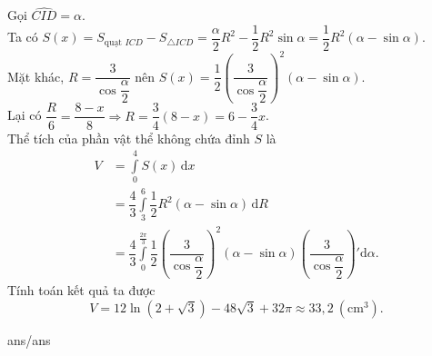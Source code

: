 \begin{ex}
{\begin{center}
		\end{center}
		Gọi $\widehat{CID}=\alpha$.
		\\
		Ta có
		$S(x)=S_{\text{quạt } ICD}-S_{\triangle ICD}
		= \dfrac{\alpha}{2} R^2-\dfrac{1}{2} R^2 \sin\alpha
		= \dfrac{1}{2} R^2 (\alpha-\sin\alpha)$.
		\\
		Mặt khác, $R=\dfrac{3}{\cos \dfrac{\alpha}{2}}$ nên $S(x)=\dfrac{1}{2} \left( \dfrac{3}{\cos \dfrac{\alpha}{2}} \right)^2 (\alpha-\sin\alpha)$.
		\\
		Lại có
		$\dfrac{R}{6}=\dfrac{8-x}{8}\Rightarrow R=\dfrac{3}{4}(8-x)=6-\dfrac{3}{4}x$.
		\\
		Thể tích của phần vật thể không chứa đỉnh $S$ là
		\allowdisplaybreaks
		\begin{align*}
			V &= \displaystyle\int\limits_{0}^{4} S(x) \mathrm{\,d}x
			\\
			&= \dfrac{4}{3} \displaystyle\int\limits_{3}^{6} \dfrac{1}{2} R^2 (\alpha-\sin\alpha)\mathrm{\,d}R
			\\
			&= \dfrac{4}{3} \displaystyle\int\limits_{0}^{\tfrac{2\pi}{3}} \dfrac{1}{2}
			\left( \dfrac{3}{\cos \dfrac{\alpha}{2}} \right)^2
			(\alpha-\sin\alpha)
			\left( \dfrac{3}{\cos \dfrac{\alpha}{2}} \right)' \mathrm{d}\alpha.
		\end{align*}
		Tính toán kết quả ta được
		\[
		V=12\ln\left(2+\sqrt{3}\right)-48\sqrt{3}+32\pi \approx 33{,}2\ (\text{cm}^3).
		\]
	}
\end{ex}

\begin{indapan}
	{ans/ans\currfilebase}
\end{indapan}